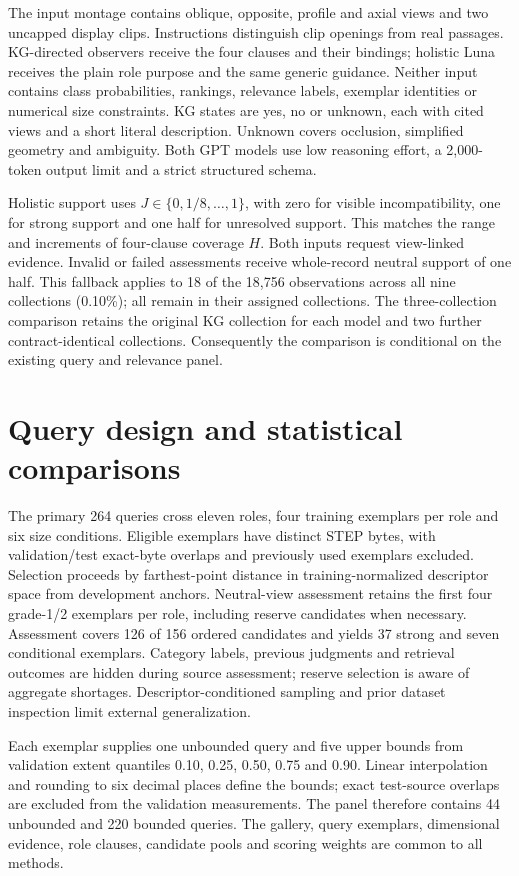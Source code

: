 \documentclass[10pt,a4paper]{article}
\begin{document}
The input montage contains oblique, opposite, profile and axial views and two
uncapped display clips. Instructions distinguish clip openings from real
passages. KG-directed observers receive the four clauses and their bindings;
holistic Luna receives the plain role purpose and the same generic guidance.
Neither input contains class probabilities, rankings, relevance labels,
exemplar identities or numerical size constraints. KG states are yes, no or
unknown, each with cited views and a short literal description. Unknown covers
occlusion, simplified geometry and ambiguity. Both GPT models use low reasoning
effort, a 2,000-token output limit and a strict structured schema.

Holistic support uses $J\in\{0,1/8,\ldots,1\}$, with zero for visible
incompatibility, one for strong support and one half for unresolved support.
This matches the range and increments of four-clause coverage $H$. Both inputs
request view-linked evidence. Invalid or failed assessments receive whole-record
neutral support of one half. This fallback applies to 18 of the 18,756 observations
across all nine collections (0.10\%); all remain in their assigned collections.
The three-collection comparison retains the original KG collection for each
model and two further contract-identical collections. Consequently the comparison
is conditional on the existing query and relevance panel.

\section{Query design and statistical comparisons}

The primary 264 queries cross eleven roles, four training exemplars per role
and six size conditions. Eligible exemplars have distinct STEP bytes, with
validation/test exact-byte overlaps and previously used exemplars excluded.
Selection proceeds by farthest-point distance in training-normalized descriptor
space from development anchors. Neutral-view assessment retains the first four
grade-1/2 exemplars per role, including reserve candidates when necessary.
Assessment covers 126 of 156 ordered candidates and yields 37 strong and seven
conditional exemplars. Category labels, previous judgments and retrieval outcomes
are hidden during source assessment; reserve selection is aware of aggregate
shortages. Descriptor-conditioned sampling and prior dataset inspection limit
external generalization.

Each exemplar supplies one unbounded query and five upper bounds from validation
extent quantiles 0.10, 0.25, 0.50, 0.75 and 0.90. Linear interpolation and rounding
to six decimal places define the bounds; exact test-source overlaps are excluded
from the validation measurements. The panel therefore contains 44 unbounded and
220 bounded queries. The gallery, query exemplars, dimensional evidence, role
clauses, candidate pools and scoring weights are common to all methods.
\end{document}
